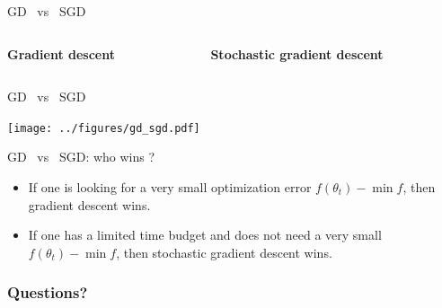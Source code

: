 \documentclass{beamer}
\begin{document}
\begin{frame}[t]{GD \ vs \ SGD}
	\grid

	\begin{columns}
		\begin{column}{0.45\textwidth}
			\vspace{-0.5cm}
			\begin{center}
				\textbf{Gradient descent}
			\end{center}
			\vspace{7cm}
	\end{column}
	\vrule
		\begin{column}{0.55\textwidth}
			\vspace{-0.5cm}
			\begin{center}
				\textbf{Stochastic gradient descent}
			\end{center}
			\vspace{7cm}
	\end{column}
	\end{columns}

\end{frame}

\begin{frame}[t]{GD \ vs \ SGD}
	\grid

	\hspace*{-0.7cm}
	\texttt{[image: ../figures/gd\_sgd.pdf]}

\end{frame}

\begin{frame}[t]{GD \ vs \ SGD: who wins ?}
	\grid

	\begin{itemize}
		\item If one is looking for a very small optimization error $f(\theta_t) - \min f$, then gradient descent wins.
			\vspace{2mm}
		\item If one has a limited time budget and does not need a very small $f(\theta_t) - \min f$, then stochastic gradient descent wins.
	\end{itemize}

\end{frame}

\appendix
\backupbegin

\begin{frame}[t]
	\frametitle{Questions?}
	\grid

	\pause
\end{frame}

\backupend
\end{document}
